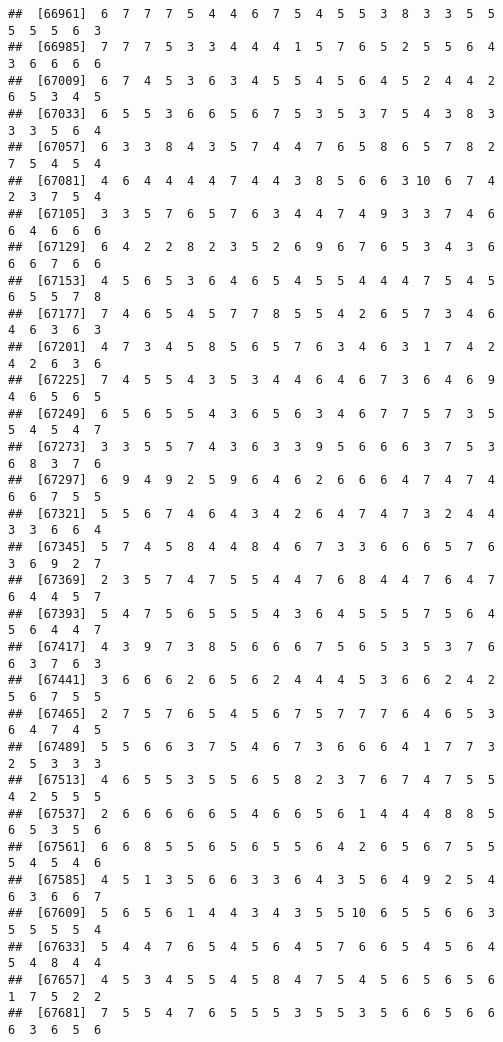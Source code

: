 \documentclass[
]{book}
\begin{document}
\begin{verbatim}
##  [66961]  6  7  7  7  5  4  4  6  7  5  4  5  5  3  8  3  3  5  5  5  5  5  6  3
##  [66985]  7  7  7  5  3  3  4  4  4  1  5  7  6  5  2  5  5  6  4  3  6  6  6  6
##  [67009]  6  7  4  5  3  6  3  4  5  5  4  5  6  4  5  2  4  4  2  6  5  3  4  5
##  [67033]  6  5  5  3  6  6  5  6  7  5  3  5  3  7  5  4  3  8  3  3  3  5  6  4
##  [67057]  6  3  3  8  4  3  5  7  4  4  7  6  5  8  6  5  7  8  2  7  5  4  5  4
##  [67081]  4  6  4  4  4  4  7  4  4  3  8  5  6  6  3 10  6  7  4  2  3  7  5  4
##  [67105]  3  3  5  7  6  5  7  6  3  4  4  7  4  9  3  3  7  4  6  6  4  6  6  6
##  [67129]  6  4  2  2  8  2  3  5  2  6  9  6  7  6  5  3  4  3  6  6  6  7  6  6
##  [67153]  4  5  6  5  3  6  4  6  5  4  5  5  4  4  4  7  5  4  5  6  5  5  7  8
##  [67177]  7  4  6  5  4  5  7  7  8  5  5  4  2  6  5  7  3  4  6  4  6  3  6  3
##  [67201]  4  7  3  4  5  8  5  6  5  7  6  3  4  6  3  1  7  4  2  4  2  6  3  6
##  [67225]  7  4  5  5  4  3  5  3  4  4  6  4  6  7  3  6  4  6  9  4  6  5  6  5
##  [67249]  6  5  6  5  5  4  3  6  5  6  3  4  6  7  7  5  7  3  5  5  4  5  4  7
##  [67273]  3  3  5  5  7  4  3  6  3  3  9  5  6  6  6  3  7  5  3  6  8  3  7  6
##  [67297]  6  9  4  9  2  5  9  6  4  6  2  6  6  6  4  7  4  7  4  6  6  7  5  5
##  [67321]  5  5  6  7  4  6  4  3  4  2  6  4  7  4  7  3  2  4  4  3  3  6  6  4
##  [67345]  5  7  4  5  8  4  4  8  4  6  7  3  3  6  6  6  5  7  6  3  6  9  2  7
##  [67369]  2  3  5  7  4  7  5  5  4  4  7  6  8  4  4  7  6  4  7  6  4  4  5  7
##  [67393]  5  4  7  5  6  5  5  5  4  3  6  4  5  5  5  7  5  6  4  5  6  4  4  7
##  [67417]  4  3  9  7  3  8  5  6  6  6  7  5  6  5  3  5  3  7  6  6  3  7  6  3
##  [67441]  3  6  6  6  2  6  5  6  2  4  4  4  5  3  6  6  2  4  2  5  6  7  5  5
##  [67465]  2  7  5  7  6  5  4  5  6  7  5  7  7  7  6  4  6  5  3  6  4  7  4  5
##  [67489]  5  5  6  6  3  7  5  4  6  7  3  6  6  6  4  1  7  7  3  2  5  3  3  3
##  [67513]  4  6  5  5  3  5  5  6  5  8  2  3  7  6  7  4  7  5  5  4  2  5  5  5
##  [67537]  2  6  6  6  6  6  5  4  6  6  5  6  1  4  4  4  8  8  5  6  5  3  5  6
##  [67561]  6  6  8  5  5  6  5  6  5  5  6  4  2  6  5  6  7  5  5  5  4  5  4  6
##  [67585]  4  5  1  3  5  6  6  3  3  6  4  3  5  6  4  9  2  5  4  6  3  6  6  7
##  [67609]  5  6  5  6  1  4  4  3  4  3  5  5 10  6  5  5  6  6  3  5  5  5  5  4
##  [67633]  5  4  4  7  6  5  4  5  6  4  5  7  6  6  5  4  5  6  4  5  4  8  4  4
##  [67657]  4  5  3  4  5  5  4  5  8  4  7  5  4  5  6  5  6  5  6  1  7  5  2  2
##  [67681]  7  5  5  4  7  6  5  5  5  3  5  5  3  5  6  6  5  6  6  6  3  6  5  6

\end{verbatim}
\end{document}
